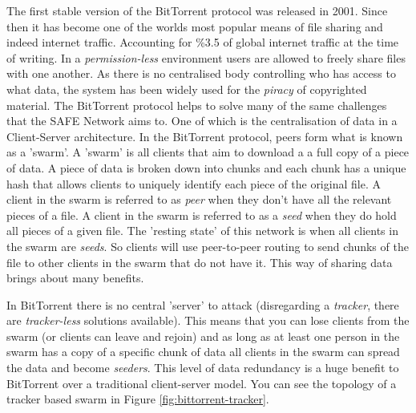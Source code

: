 The first stable version of the BitTorrent protocol was released in 2001. Since then it has become one of the worlds most popular means of file sharing and indeed internet traffic. Accounting for \%3.5 of global internet traffic at the time of writing\cite{bittorrent-usage}. In a \textit{permission-less} environment users are allowed to freely share files with one another. As there is no centralised body controlling who has access to what data, the system has been widely used for the \textit{piracy} of copyrighted material. The BitTorrent protocol helps to solve many of the same challenges that the SAFE Network aims to. One of which is the centralisation of data in a Client-Server architecture. In the BitTorrent protocol, peers form what is known as a 'swarm'. A 'swarm' is all clients that aim to download a a full copy of a piece of data. A piece of data is broken down into chunks and each chunk has a unique hash that allows clients to uniquely identify each piece of the original file. A client in the swarm is referred to as \textit{peer} when they don't have all the relevant pieces of a file. A client in the swarm is referred to as a \textit{seed} when they do hold all pieces of a given file. The 'resting state' of this network is when all clients in the swarm are \textit{seeds}. So clients will use peer-to-peer routing to send chunks of the file to other clients in the swarm that do not have it. This way of sharing data brings about many benefits. 

In BitTorrent there is no central 'server' to attack (disregarding a \textit{tracker}, there are \textit{tracker-less} solutions available). This means that you can lose clients from the swarm (or clients can leave and rejoin) and as long as at least one person in the swarm has a copy of a specific chunk of data all clients in the swarm can spread the data and become \textit{seeders}. This level of data redundancy is a huge benefit to BitTorrent over a traditional client-server model. You can see the topology of a tracker based swarm in Figure \ref{fig:bittorrent-tracker}.

